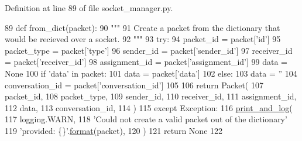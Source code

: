 Definition at line 89 of file socket\+\_\+manager.\+py.


\begin{DoxyCode}
89     \textcolor{keyword}{def }from\_dict(packet):
90         \textcolor{stringliteral}{"""}
91 \textcolor{stringliteral}{        Create a packet from the dictionary that would be recieved over a socket.}
92 \textcolor{stringliteral}{        """}
93         \textcolor{keywordflow}{try}:
94             packet\_id = packet[\textcolor{stringliteral}{'id'}]
95             packet\_type = packet[\textcolor{stringliteral}{'type'}]
96             sender\_id = packet[\textcolor{stringliteral}{'sender\_id'}]
97             receiver\_id = packet[\textcolor{stringliteral}{'receiver\_id'}]
98             assignment\_id = packet[\textcolor{stringliteral}{'assignment\_id'}]
99             data = \textcolor{keywordtype}{None}
100             \textcolor{keywordflow}{if} \textcolor{stringliteral}{'data'} \textcolor{keywordflow}{in} packet:
101                 data = packet[\textcolor{stringliteral}{'data'}]
102             \textcolor{keywordflow}{else}:
103                 data = \textcolor{stringliteral}{''}
104             conversation\_id = packet[\textcolor{stringliteral}{'conversation\_id'}]
105 
106             \textcolor{keywordflow}{return} Packet(
107                 packet\_id,
108                 packet\_type,
109                 sender\_id,
110                 receiver\_id,
111                 assignment\_id,
112                 data,
113                 conversation\_id,
114             )
115         \textcolor{keywordflow}{except} Exception:
116             \hyperlink{namespaceparlai_1_1mturk_1_1core_1_1dev_1_1test_1_1test__full__system_a5266aae537d9c5f37809ebaf7bcc3b49}{print\_and\_log}(
117                 logging.WARN,
118                 \textcolor{stringliteral}{'Could not create a valid packet out of the dictionary'}
119                 \textcolor{stringliteral}{'provided: \{\}'}.\hyperlink{namespaceparlai_1_1chat__service_1_1services_1_1messenger_1_1shared__utils_a32e2e2022b824fbaf80c747160b52a76}{format}(packet),
120             )
121             \textcolor{keywordflow}{return} \textcolor{keywordtype}{None}
122 
\end{DoxyCode}
\mbox{\label{classparlai_1_1mturk_1_1core_1_1socket__manager_1_1Packet_a92f4ae50a21d22ab63b041f23d210928}} 
